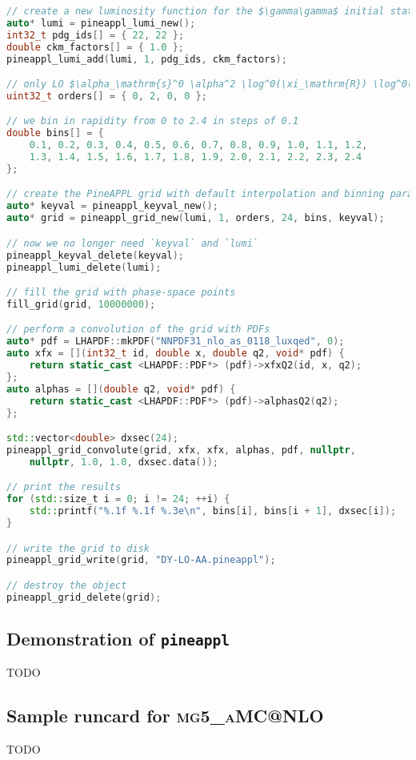 \clearpage
\begin{lstlisting}[language=C++,mathescape=true]
// create a new luminosity function for the $\gamma\gamma$ initial state
auto* lumi = pineappl_lumi_new();
int32_t pdg_ids[] = { 22, 22 };
double ckm_factors[] = { 1.0 };
pineappl_lumi_add(lumi, 1, pdg_ids, ckm_factors);

// only LO $\alpha_\mathrm{s}^0 \alpha^2 \log^0(\xi_\mathrm{R}) \log^0(\xi_\mathrm{F})$
uint32_t orders[] = { 0, 2, 0, 0 };

// we bin in rapidity from 0 to 2.4 in steps of 0.1
double bins[] = {
    0.1, 0.2, 0.3, 0.4, 0.5, 0.6, 0.7, 0.8, 0.9, 1.0, 1.1, 1.2,
    1.3, 1.4, 1.5, 1.6, 1.7, 1.8, 1.9, 2.0, 2.1, 2.2, 2.3, 2.4
};

// create the PineAPPL grid with default interpolation and binning parameters
auto* keyval = pineappl_keyval_new();
auto* grid = pineappl_grid_new(lumi, 1, orders, 24, bins, keyval);

// now we no longer need `keyval` and `lumi`
pineappl_keyval_delete(keyval);
pineappl_lumi_delete(lumi);

// fill the grid with phase-space points
fill_grid(grid, 10000000);

// perform a convolution of the grid with PDFs
auto* pdf = LHAPDF::mkPDF("NNPDF31_nlo_as_0118_luxqed", 0);
auto xfx = [](int32_t id, double x, double q2, void* pdf) {
    return static_cast <LHAPDF::PDF*> (pdf)->xfxQ2(id, x, q2);
};
auto alphas = [](double q2, void* pdf) {
    return static_cast <LHAPDF::PDF*> (pdf)->alphasQ2(q2);
};

std::vector<double> dxsec(24);
pineappl_grid_convolute(grid, xfx, xfx, alphas, pdf, nullptr,
    nullptr, 1.0, 1.0, dxsec.data());

// print the results
for (std::size_t i = 0; i != 24; ++i) {
    std::printf("%.1f %.1f %.3e\n", bins[i], bins[i + 1], dxsec[i]);
}

// write the grid to disk
pineappl_grid_write(grid, "DY-LO-AA.pineappl");

// destroy the object
pineappl_grid_delete(grid);
\end{lstlisting}
\clearpage

\subsection{Demonstration of \texorpdfstring{\texttt{pineappl}}{pineappl}}
\label{app:pineappl-demo}

TODO

\subsection{Sample runcard for \texorpdfstring{\textsc{mg5\_aMC@NLO}}{mg5\_aMC@NLO}}
\label{app:sample-runcard}

TODO
